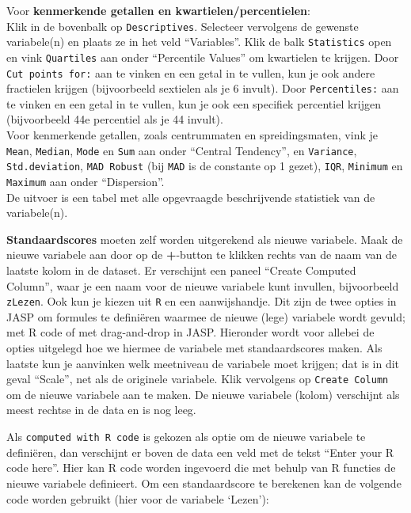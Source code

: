 \documentclass[
]{book}
\begin{document}
Voor \textbf{kenmerkende getallen en kwartielen/percentielen}:\\
Klik in de bovenbalk op \texttt{Descriptives}. Selecteer vervolgens de gewenste variabele(n) en plaats ze in het veld ``Variables''. Klik de balk \texttt{Statistics} open en vink \texttt{Quartiles} aan onder ``Percentile Values'' om kwartielen te krijgen. Door \texttt{Cut\ points\ for:} aan te vinken en een getal in te vullen, kun je ook andere fractielen krijgen (bijvoorbeeld sextielen als je 6 invult). Door \texttt{Percentiles:} aan te vinken en een getal in te vullen, kun je ook een specifiek percentiel krijgen (bijvoorbeeld 44e percentiel als je 44 invult).\\
Voor kenmerkende getallen, zoals centrummaten en spreidingsmaten, vink je \texttt{Mean}, \texttt{Median}, \texttt{Mode} en \texttt{Sum} aan onder ``Central Tendency'', en \texttt{Variance}, \texttt{Std.deviation}, \texttt{MAD\ Robust} (bij \texttt{MAD} is de constante op 1 gezet), \texttt{IQR}, \texttt{Minimum} en \texttt{Maximum} aan onder ``Dispersion''.\\
De uitvoer is een tabel met alle opgevraagde beschrijvende statistiek van de variabele(n).

\textbf{Standaardscores} moeten zelf worden uitgerekend als nieuwe variabele. Maak de nieuwe variabele aan door op de \textbf{+}-button te klikken rechts van de naam van de laatste kolom in de dataset. Er verschijnt een paneel ``Create Computed Column'', waar je een naam voor de nieuwe variabele kunt invullen, bijvoorbeeld \texttt{zLezen}. Ook kun je kiezen uit \texttt{R} en een aanwijshandje. Dit zijn de twee opties in JASP om formules te definiëren waarmee de nieuwe (lege) variabele wordt gevuld; met R code of met drag-and-drop in JASP. Hieronder wordt voor allebei de opties uitgelegd hoe we hiermee de variabele met standaardscores maken. Als laatste kun je aanvinken welk meetniveau de variabele moet krijgen; dat is in dit geval ``Scale'', net als de originele variabele. Klik vervolgens op \texttt{Create\ Column} om de nieuwe variabele aan te maken. De nieuwe variabele (kolom) verschijnt als meest rechtse in de data en is nog leeg.

Als \texttt{computed\ with\ R\ code} is gekozen als optie om de nieuwe variabele te definiëren, dan verschijnt er boven de data een veld met de tekst ``Enter your R code here''. Hier kan R code worden ingevoerd die met behulp van R functies de nieuwe variabele definieert. Om een standaardscore te berekenen kan de volgende code worden gebruikt (hier voor de variabele `Lezen'):
\end{document}
